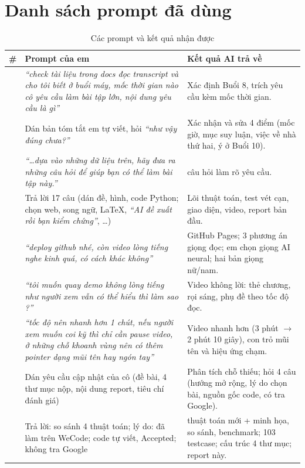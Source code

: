 \documentclass[12pt,a4paper]{report}
\begin{document}
\section{Danh sách prompt đã dùng}
\begin{longtable}{>{\centering\arraybackslash}p{0.5cm} >{\raggedright\arraybackslash}p{6.1cm} >{\raggedright\arraybackslash}p{6.9cm}}
\caption{Các prompt và kết quả nhận được}\label{tab:prompts}\\
\toprule
\# & \textbf{Prompt của em} & \textbf{Kết quả AI trả về}\\\midrule\endhead
1 & \textit{``check tài liệu trong docs đọc transcript và cho tôi biết ở buổi máy, mốc thời gian nào cô yêu cầu làm bài tập lớn, nội dung yêu cầu là gì''} & Xác định Buổi 8, trích yêu cầu kèm mốc thời gian.\\\midrule
2 & Dán bản tóm tắt em tự viết, hỏi \textit{``như vậy đúng chưa?''} & Xác nhận và sửa 4 điểm (mốc giờ, mục suy luận, việc về nhà thứ hai, ý ở Buổi 10).\\\midrule
3 & \textit{``\dots dựa vào những dữ liệu trên, hãy đưa ra những câu hỏi để giúp bạn có thể làm bài tập này.''} & 17 câu hỏi làm rõ yêu cầu.\\\midrule
4 & Trả lời 17 câu (dán đề, hình, code Python; chọn web, song ngữ, \LaTeX, \textit{``AI đề xuất rồi bạn kiểm chứng''}, \dots) & Lõi thuật toán, test vét cạn, giao diện, video, report bản đầu.\\\midrule
5 & \textit{``deploy github nhé, còn video lòng tiếng nghe kinh quá, có cách khác không''} & GitHub Pages; 3 phương án giọng đọc; em chọn giọng AI neural; hai bản giọng nữ/nam.\\\midrule
6 & \textit{``tôi muốn quay demo không lòng tiếng như người xem vẫn có thể hiểu thì làm sao ?''} & Video không lời: thẻ chương, rọi sáng, phụ đề theo tốc độ đọc.\\\midrule
7 & \textit{``tốc độ nên nhanh hơn 1 chút, nếu người xem muốn coi kỹ thì chỉ cần pause video, ở những chỗ khoanh vùng nên có thêm pointer dạng mũi tên hay ngón tay''} & Video nhanh hơn (3 phút $\to$ 2 phút 10 giây), con trỏ mũi tên và hiệu ứng chạm.\\\midrule
8 & Dán yêu cầu cập nhật của cô (đề bài, 4 thư mục nộp, nội dung report, tiêu chí đánh giá) & Phân tích chỗ thiếu; hỏi 4 câu (hướng mở rộng, lý do chọn bài, nguồn gốc code, có tra Google).\\\midrule
9 & Trả lời: so sánh 4 thuật toán; lý do: đã làm trên WeCode; code tự viết, Accepted; không tra Google & 3 thuật toán mới + minh họa, so sánh, benchmark; 103 testcase; cấu trúc 4 thư mục; report này.\\
\bottomrule
\end{longtable}
\end{document}
